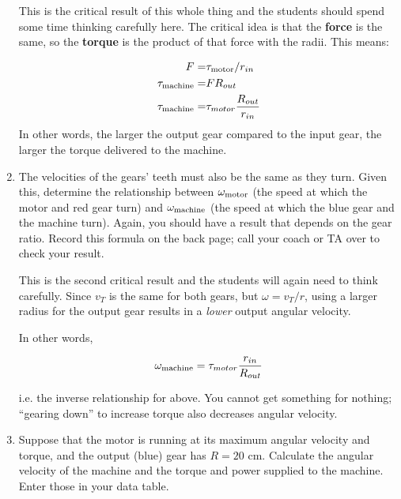 \documentclass[12pt]{article}
\begin{document}
\begin{enumerate}
{\color{red}
	
	This is the critical result of this whole thing and the students should spend some time thinking carefully here. The critical idea is that the {\bf force} is the same, so the {\bf torque} is the product of that force with the radii. This means:
	
	\begin{align*}
		F =& \tau_{\rm motor} / r_{in} \\
		\tau_{\rm machine} =& F R_{out} \\
		\tau_{\rm machine} =& \tau_{motor} \frac{R_{out}}{r_{in}}
	\end{align*}
In other words, the larger the output gear compared to the input gear, the larger the torque delivered to the machine.
	
}

\vspace{1.8in}

\item The velocities of the gears' teeth must also be the same as they turn. Given this, determine the relationship between $\omega_{\rm {motor}}$ (the speed at which the motor and red gear turn) and $\omega_{\rm {machine}}$ (the speed at which the blue gear and the machine turn). Again, you should have a result that depends on the gear ratio. Record this formula on the back page; call your coach or TA over to check your result.

{\color{red}
	
	This is the second critical result and the students will again need to think carefully. Since $v_T$ is the same for both gears, but $\omega = v_T / r$, using a larger radius for the output gear results in a {\it lower} output angular velocity.
	
	In other words,
	
	$$\omega_{\rm machine} = \tau_{motor} \frac{r_{in}}{R_{out}}$$
	
	i.e. the inverse relationship for above. You cannot get something for nothing; ``gearing down'' to increase torque also decreases angular velocity.
}
	
	
\newpage

\vspace{2in}

\item  Suppose that the motor is running at its maximum angular velocity and torque, and the output (blue) gear has $R=20$ cm. Calculate the angular velocity of the machine and the torque and power supplied to the machine. Enter those in your data table.


\end{enumerate}
\end{document}
